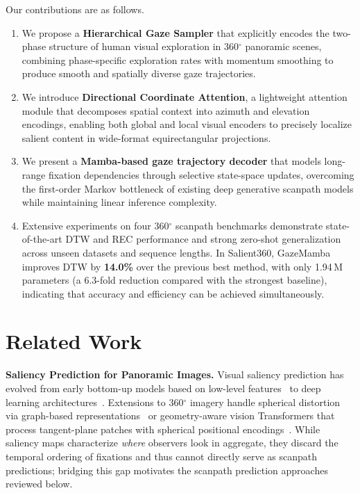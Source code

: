 \documentclass[sigconf]{acmart}
\begin{document}
Our contributions are as follows.
\begin{enumerate}[topsep=2pt,itemsep=2pt]
  \item We propose a \textbf{Hierarchical Gaze Sampler} that explicitly encodes the two-phase structure of human visual exploration in 360$^\circ$ panoramic scenes, combining phase-specific exploration rates with momentum smoothing to produce smooth and spatially diverse gaze trajectories.
  \item We introduce \textbf{Directional Coordinate Attention}, a lightweight attention module that decomposes spatial context into azimuth and elevation encodings, enabling both global and local visual encoders to precisely localize salient content in wide-format equirectangular projections.
  \item We present a \textbf{Mamba-based gaze trajectory decoder} that models long-range fixation dependencies through selective state-space updates, overcoming the first-order Markov bottleneck of existing deep generative scanpath models while maintaining linear inference complexity.
  \item Extensive experiments on four 360$^\circ$ scanpath benchmarks demonstrate state-of-the-art DTW and REC performance and strong zero-shot generalization across unseen datasets and sequence lengths. In Salient360, GazeMamba improves DTW by \textbf{14.0\%} over the previous best method, with only 1.94\,M parameters (a 6.3-fold reduction compared with the strongest baseline), indicating that accuracy and efficiency can be achieved simultaneously.
\end{enumerate}

\section{Related Work}

\textbf{Saliency Prediction for Panoramic Images.} Visual saliency prediction has evolved from early bottom-up models based on low-level features~\cite{itti1998saliency} to deep learning architectures~\cite{li2016deepcontrast,wang2017salientobject}. Extensions to 360$^\circ$ imagery handle spherical distortion via graph-based representations~\cite{lv2020salgcn,chen2020salbinet360} or geometry-aware vision Transformers that process tangent-plane patches with spherical positional encodings~\cite{cokelek2024salvit360}. While saliency maps characterize \emph{where} observers look in aggregate, they discard the temporal ordering of fixations and thus cannot directly serve as scanpath predictions; bridging this gap motivates the scanpath prediction approaches reviewed below.
\vspace{1em}
\end{document}
